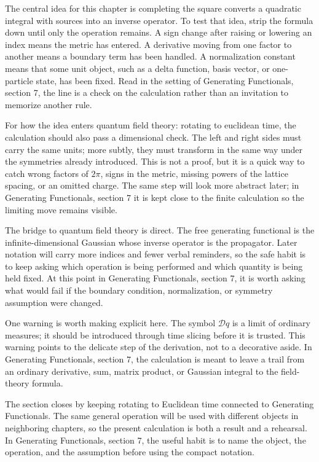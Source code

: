 The central idea for this chapter is completing the square converts a quadratic integral with sources into an inverse operator.  To test that idea, strip the formula down until only the operation remains.  A sign change after raising or lowering an index means the metric has entered.  A derivative moving from one factor to another means a boundary term has been handled.  A normalization constant means that some unit object, such as a delta function, basis vector, or one-particle state, has been fixed.  Read in the setting of Generating Functionals, section 7, the line is a check on the calculation rather than an invitation to memorize another rule.

For how the idea enters quantum field theory: rotating to euclidean time, the calculation should also pass a dimensional check.  The left and right sides must carry the same units; more subtly, they must transform in the same way under the symmetries already introduced.  This is not a proof, but it is a quick way to catch wrong factors of \(2\pi\), signs in the metric, missing powers of the lattice spacing, or an omitted charge.  The same step will look more abstract later; in Generating Functionals, section 7 it is kept close to the finite calculation so the limiting move remains visible.

The bridge to quantum field theory is direct.  The free generating functional is the infinite-dimensional Gaussian whose inverse operator is the propagator.  Later notation will carry more indices and fewer verbal reminders, so the safe habit is to keep asking which operation is being performed and which quantity is being held fixed.  At this point in Generating Functionals, section 7, it is worth asking what would fail if the boundary condition, normalization, or symmetry assumption were changed.

One warning is worth making explicit here.  The symbol \(\mathcal D q\) is a limit of ordinary measures; it should be introduced through time slicing before it is trusted.  This warning points to the delicate step of the derivation, not to a decorative aside.  In Generating Functionals, section 7, the calculation is meant to leave a trail from an ordinary derivative, sum, matrix product, or Gaussian integral to the field-theory formula.

The section closes by keeping rotating to Euclidean time connected to Generating Functionals.  The same general operation will be used with different objects in neighboring chapters, so the present calculation is both a result and a rehearsal.  In Generating Functionals, section 7, the useful habit is to name the object, the operation, and the assumption before using the compact notation.



